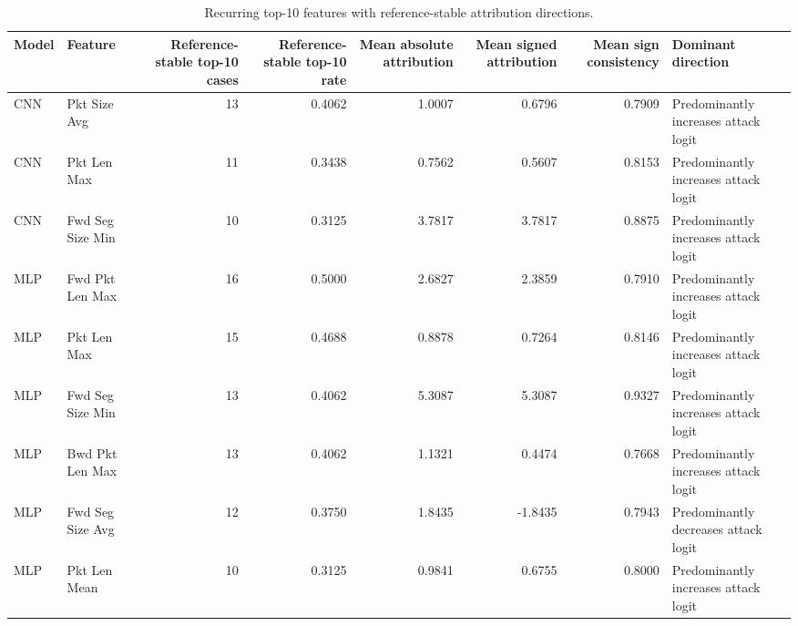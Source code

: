 \begin{table}
\caption{Recurring top-10 features with reference-stable attribution directions.}
\label{tab:ig_recurring_reference_stable_features}
\begin{tabular}{llrrrrrl}
\toprule
Model & Feature & Reference-stable top-10 cases & Reference-stable top-10 rate & Mean absolute attribution & Mean signed attribution & Mean sign consistency & Dominant direction \\
\midrule
CNN & Pkt Size Avg & 13 & 0.4062 & 1.0007 & 0.6796 & 0.7909 & Predominantly increases attack logit \\
CNN & Pkt Len Max & 11 & 0.3438 & 0.7562 & 0.5607 & 0.8153 & Predominantly increases attack logit \\
CNN & Fwd Seg Size Min & 10 & 0.3125 & 3.7817 & 3.7817 & 0.8875 & Predominantly increases attack logit \\
MLP & Fwd Pkt Len Max & 16 & 0.5000 & 2.6827 & 2.3859 & 0.7910 & Predominantly increases attack logit \\
MLP & Pkt Len Max & 15 & 0.4688 & 0.8878 & 0.7264 & 0.8146 & Predominantly increases attack logit \\
MLP & Fwd Seg Size Min & 13 & 0.4062 & 5.3087 & 5.3087 & 0.9327 & Predominantly increases attack logit \\
MLP & Bwd Pkt Len Max & 13 & 0.4062 & 1.1321 & 0.4474 & 0.7668 & Predominantly increases attack logit \\
MLP & Fwd Seg Size Avg & 12 & 0.3750 & 1.8435 & -1.8435 & 0.7943 & Predominantly decreases attack logit \\
MLP & Pkt Len Mean & 10 & 0.3125 & 0.9841 & 0.6755 & 0.8000 & Predominantly increases attack logit \\
\bottomrule
\end{tabular}
\end{table}
